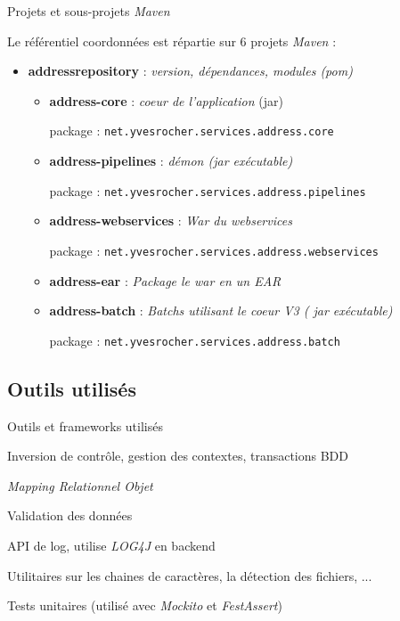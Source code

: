 \documentclass[compact]{beamer}%
\begin{document}
\begin{frame}{Projets et sous-projets \emph{Maven}}
	
	Le référentiel coordonnées est répartie sur 6 projets \emph{Maven} :
	\begin{itemize}[<+->]
	\item \textbf{addressrepository} : \emph{version, dépendances, modules (pom)} 
		\begin{itemize}
		\item \textbf{address-core} : \emph{coeur de l'application} (jar)\par
		package : \texttt{net.yvesrocher.services.address.core}
		\item \textbf{address-pipelines} : \emph{démon (jar exécutable)}\par
		package : \texttt{net.yvesrocher.services.address.pipelines}
		\item \textbf{address-webservices} : \emph{War du webservices}\par
		package : \texttt{net.yvesrocher.services.address.webservices}
		\item \textbf{address-ear} : \emph{Package le war en un EAR}
		\item \textbf{address-batch} : \emph{Batchs utilisant le coeur V3 ( jar exécutable)}\par
		package : \texttt{net.yvesrocher.services.address.batch}
		\end{itemize}
	\end{itemize}

\end{frame}

\subsection{Outils utilisés}

\begin{frame}{Outils et frameworks utilisés}

	\begin{description}[<+->]
	\item[Spring] Inversion de contrôle, gestion des contextes, transactions BDD
	\item[Hibernate] \emph{Mapping Relationnel Objet}
	\item[Hibernate Validator] Validation des données
	\item[SLF4J] API de log, utilise \emph{LOG4J} en backend
	\item[Commons Apache] Utilitaires sur les chaines de caractères, la détection des fichiers, ...
	\item[JUNIT] Tests unitaires (utilisé avec \emph{Mockito} et \emph{FestAssert})
	\end{description}
	
\end{frame}
\end{document}
